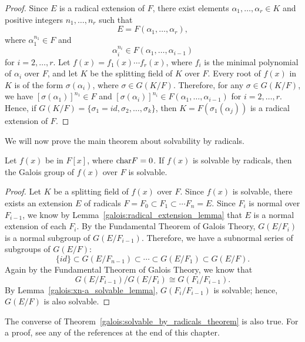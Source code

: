  
\begin{proof}
Since $E$ is a radical extension of $F$, there exist elements
$\alpha_1, \ldots, \alpha_r \in K$ and positive integers  
$n_1, \ldots, n_r$ such that 
\[
E=F(\alpha_1, \ldots, \alpha_r ),
\]
where $\alpha_1^{n_1} \in F$ and
\[
\alpha_i^{n_i} \in F( \alpha_1, \ldots, \alpha_{i-1} )
\]
for $i = 2, \dots, r$. Let $f(x) = f_1(x) \cdots f_r(x)$, where $f_i$
is the minimal polynomial of $\alpha_i$ over $F$, and let $K$ be the
splitting field of $K$ over $F$.  Every root  of $f(x)$ in $K$ is of
the form $\sigma( \alpha_i)$, where $\sigma \in G(K/F)$. Therefore,
for any $\sigma \in G(K/F)$, we have $[\sigma(\alpha_1)]^{n_1} \in F$
and $[\sigma(\alpha_i)]^{n_i} \in F( \alpha_1, \ldots, \alpha_{i-1} )$
for $i = 2, \dots, r$.  Hence, if $G(K/F) = \{\sigma_1 = id, \sigma_2,
\ldots, \sigma_k \}$, then $K = F( \sigma_1( \alpha_j) )$ is a radical
extension of $F$. 
\end{proof}


\medskip


We will now prove the main theorem about solvability by radicals.
 
 
\begin{theorem}\label{galois:solvable_by_radicals_theorem}
Let $f(x)$ be in $F[x]$, where ${\rm char} F = 0$. If $f(x)$ is
solvable by radicals, then the Galois group of $f(x)$ over $F$ is 
solvable.
\end{theorem}
 
 
\begin{proof}
Let $K$ be a splitting field of $f(x)$ over $F$. Since $f(x)$ is
solvable, there exists an extension $E$ of radicals $F = F_0 \subset
F_1 \subset \cdots F_n = E$. Since $F_i$ is normal over $F_{i-1}$, we
know by Lemma~\ref{galois:radical_extension_lemma} that $E$ is a normal extension of each $F_i$. By
the Fundamental Theorem of Galois Theory, $G(E/F_i)$ is a normal
subgroup of $G(E/F_{i-1})$.  Therefore, we have a subnormal series of
subgroups of $G(E/F)$:  
\[
\{ id \} \subset G(E/F_{n-1}) \subset \cdots \subset G(E/F_1) \subset
G(E/F).
\]
Again by the Fundamental Theorem of Galois Theory, we know that
\[
G(E/F_{i-1})/G(E/F_i) \cong G(F_i/F_{i-1}).
\]
By Lemma~\ref{galois:xn-a_solvable_lemma}, $G(F_i/F_{i-1})$ is solvable; hence, $G(E/F)$ is also
solvable. 
\mbox{\hspace{1in}}
\end{proof}


\medskip


The converse of Theorem~\ref{galois:solvable_by_radicals_theorem} is also true.  For a proof, see any of the
references at the end of this chapter.
 
